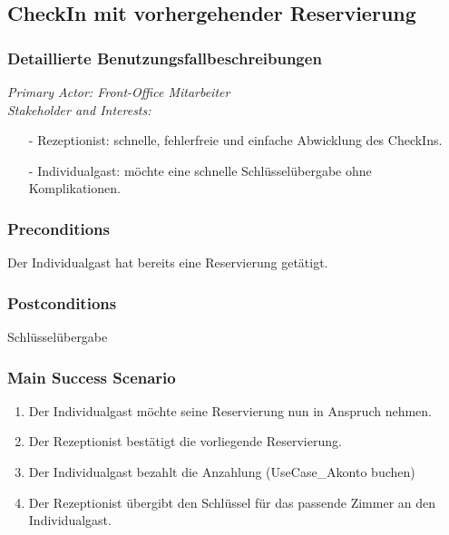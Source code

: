 \documentclass[./detailed_overview_usecases.tex]{subfiles}
\begin{document}
    \subsection{CheckIn mit vorhergehender Reservierung}
    \subsubsection{Detaillierte Benutzungsfallbeschreibungen}
    \textit{Primary Actor: Front-Office Mitarbeiter}
    \\
    \textit{Stakeholder and Interests:}
    \begin{itemize}
        \item[-] Rezeptionist: schnelle, fehlerfreie und einfache Abwicklung des CheckIns.
        \item[-] Individualgast: möchte eine schnelle Schlüsselübergabe ohne Komplikationen.
    \end{itemize}

    \subsubsection*{Preconditions}
    Der Individualgast hat bereits eine Reservierung getätigt.
    \subsubsection*{Postconditions}
    Schlüsselübergabe

    \subsubsection*{Main Success Scenario}
    \begin{enumerate}
        \item Der Individualgast möchte seine Reservierung nun in Anspruch nehmen.
        \item Der Rezeptionist bestätigt die vorliegende Reservierung.
        \item Der Individualgast bezahlt die Anzahlung (UseCase_Akonto buchen)
        \item Der Rezeptionist übergibt den Schlüssel für das passende Zimmer an den Individualgast.
    \end{enumerate}
\end{document}
